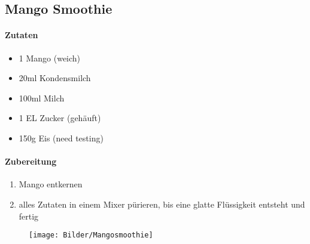 \newpage
\subsection{Mango Smoothie}
\paragraph{Zutaten}
\begin{itemize}[noitemsep]
	\item 1 Mango (weich)
	\item 20ml Kondensmilch
	\item 100ml Milch 
	\item 1 EL Zucker (gehäuft)
	\item 150g Eis (need testing)
\end{itemize}
\paragraph{Zubereitung}
\begin{enumerate}[noitemsep]
	\item Mango entkernen 
	\item alles Zutaten in einem Mixer pürieren, bis eine glatte Flüssigkeit entsteht und fertig
\end{enumerate}
\vspace{0.5cm}
\begin{figure}[h]
\centering
\texttt{[image: Bilder/Mangosmoothie]}
\end{figure}